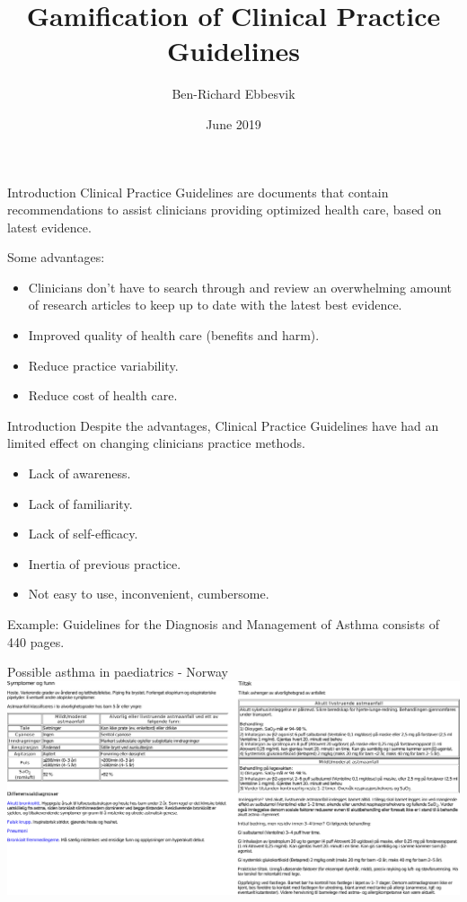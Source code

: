 \documentclass{beamer}
\begin{document}
\title{Gamification of Clinical Practice Guidelines}
\author{Ben-Richard Ebbesvik}
\date{June 2019}
\subject{Master thesis}
\frame{\titlepage}


\begin{frame}{Introduction}
Clinical Practice Guidelines are documents that contain recommendations to assist clinicians providing optimized health care, based on latest evidence. 

Some advantages:
\begin{itemize}
	\item Clinicians don't have to search through and review an overwhelming amount of research articles to keep up to date with the latest best evidence.
	\item Improved quality of health care (benefits and harm).
	\item Reduce practice variability.
	\item Reduce cost of health care.
\end{itemize}	
\end{frame}

\begin{frame}{Introduction}
Despite the advantages, Clinical Practice Guidelines have had an limited effect on changing clinicians practice methods.
\begin{itemize}
	\item Lack of awareness.
	\item Lack of familiarity.
	\item  Lack of self-efficacy.
	\item Inertia of previous practice.
	\item Not easy to use, inconvenient, cumbersome.
\end{itemize}
Example: Guidelines for the Diagnosis and Management of Asthma consists of 440 pages.
\end{frame}

\begin{frame}{Possible asthma in paediatrics - Norway}
\includegraphics[scale=0.32]{NorwayCPG}
\end{frame}
\end{document}
